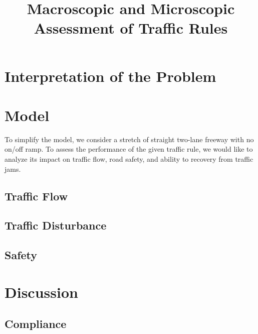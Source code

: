 \documentclass[aps,prl,superscriptaddress,12pt]{revtex4-1}
\begin{document}
	\title{Macroscopic and Microscopic Assessment of Traffic Rules}
		
	\begin{abstract}
		
	\end{abstract}
	
\maketitle

	\section{Interpretation of the Problem}


	\section{Model}
	To simplify the model, we consider a stretch of straight two-lane freeway with no on/off ramp. To assess the performance of the given traffic rule, we would like to analyze its impact on traffic flow, road safety, and ability to recovery from traffic jams.
		\subsection{Traffic Flow} 
		
	
		\subsection{Traffic Disturbance}
			
	
		\subsection{Safety}
		
	
	\section{Discussion}
		\subsection{Compliance}
		
	
\end{document}
